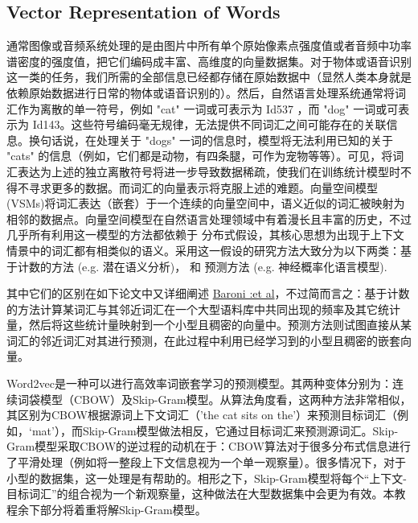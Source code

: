 \subsection{Vector Representation of Words}
通常图像或音频系统处理的是由图片中所有单个原始像素点强度值或者音频中功率谱密度的强度值，把它们编码成丰富、高维度的向量数据集。对于物体或语音识别这一类的任务，我们所需的全部信息已经都存储在原始数据中（显然人类本身就是依赖原始数据进行日常的物体或语音识别的）。然后，自然语言处理系统通常将词汇作为离散的单一符号，例如 "cat" 一词或可表示为 Id537 ，而 "dog" 一词或可表示为 Id143。这些符号编码毫无规律，无法提供不同词汇之间可能存在的关联信息。换句话说，在处理关于 "dogs" 一词的信息时，模型将无法利用已知的关于 "cats" 的信息（例如，它们都是动物，有四条腿，可作为宠物等等）。可见，将词汇表达为上述的独立离散符号将进一步导致数据稀疏，使我们在训练统计模型时不得不寻求更多的数据。而词汇的向量表示将克服上述的难题。向量空间模型 (VSMs)将词汇表达（嵌套）于一个连续的向量空间中，语义近似的词汇被映射为相邻的数据点。向量空间模型在自然语言处理领域中有着漫长且丰富的历史，不过几乎所有利用这一模型的方法都依赖于 分布式假设，其核心思想为出现于上下文情景中的词汇都有相类似的语义。采用这一假设的研究方法大致分为以下两类：基于计数的方法 (e.g. 潜在语义分析)， 和 预测方法 (e.g. 神经概率化语言模型).

其中它们的区别在如下论文中又详细阐述 \href{http://clic.cimec.unitn.it/marco/publications/acl2014/baroni-etal-countpredict-acl2014.pdf}{Baroni :et al}，不过简而言之：基于计数的方法计算某词汇与其邻近词汇在一个大型语料库中共同出现的频率及其它统计量，然后将这些统计量映射到一个小型且稠密的向量中。预测方法则试图直接从某词汇的邻近词汇对其进行预测，在此过程中利用已经学习到的小型且稠密的嵌套向量。

Word2vec是一种可以进行高效率词嵌套学习的预测模型。其两种变体分别为：连续词袋模型（CBOW）及Skip-Gram模型。从算法角度看，这两种方法非常相似，其区别为CBOW根据源词上下文词汇（'the cat sits on the'）来预测目标词汇（例如，‘mat’），而Skip-Gram模型做法相反，它通过目标词汇来预测源词汇。Skip-Gram模型采取CBOW的逆过程的动机在于：CBOW算法对于很多分布式信息进行了平滑处理（例如将一整段上下文信息视为一个单一观察量）。很多情况下，对于小型的数据集，这一处理是有帮助的。相形之下，Skip-Gram模型将每个“上下文-目标词汇”的组合视为一个新观察量，这种做法在大型数据集中会更为有效。本教程余下部分将着重将解Skip-Gram模型。
